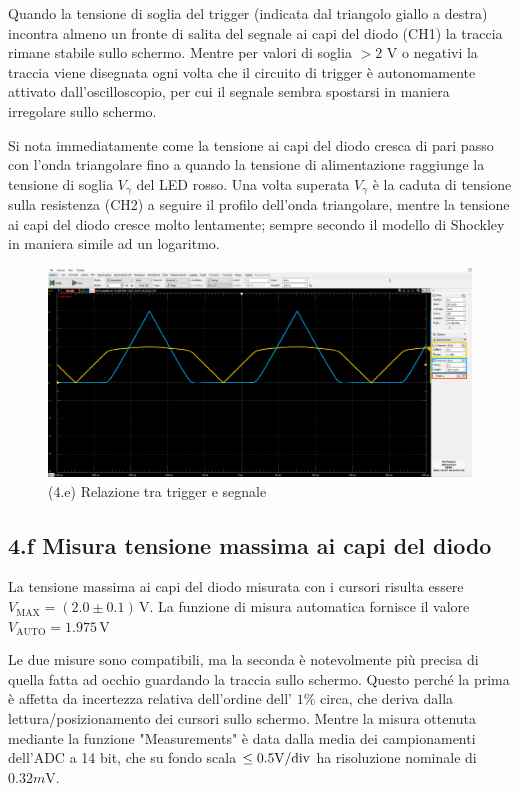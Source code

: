\documentclass[10pt, a4paper, italian]{article}
\begin{document}
Quando la tensione di soglia del trigger (indicata dal triangolo giallo a
destra) incontra almeno un fronte di salita del segnale ai capi del diodo 
(CH1) la traccia rimane stabile sullo schermo. Mentre per valori di soglia
$> 2$ V o negativi la traccia viene disegnata ogni volta che il circuito di
trigger è autonomamente attivato dall'oscilloscopio, per cui il segnale sembra
spostarsi in maniera irregolare sullo schermo.

Si nota immediatamente come la tensione ai capi del diodo cresca di pari
passo con l'onda triangolare fino a quando la tensione di alimentazione 
raggiunge la tensione di soglia $V_\gamma$ del LED rosso. Una volta superata
$V_\gamma$ è la caduta di tensione sulla resistenza (CH2) a seguire il profilo
dell'onda triangolare, mentre la tensione ai capi del diodo cresce molto
lentamente; sempre secondo il modello di Shockley in maniera simile ad un
logaritmo.

\begin{figure}[htb]
\centering
\includegraphics[scale=0.3]{trgdiode_new}
\caption{(4.e) Relazione tra trigger e segnale}
\end{figure}


\subsection*{4.f Misura tensione massima ai capi del diodo}

La tensione massima ai capi del diodo misurata con i cursori risulta essere
$V_{\mathrm{MAX}}= (2.0 \pm 0.1) \,\mathrm{V}$. La funzione di misura
automatica fornisce il valore $V_{\mathrm{AUTO}}= 1.975 \,\mathrm{V}$

Le due misure sono compatibili, ma la seconda è notevolmente più precisa di
quella fatta ad occhio guardando la traccia sullo schermo. Questo perché la
prima è affetta da incertezza relativa dell'ordine dell' $1\%$ circa, che
deriva dalla lettura/posizionamento dei cursori sullo schermo. Mentre la
misura ottenuta mediante la funzione "Measurements" è data dalla media dei
campionamenti dell'ADC a 14 bit, che su fondo scala $\leq 0.5 \si{\V}/\rm div$
ha risoluzione nominale di $0.32 \si{m\V}$.
\end{document}
